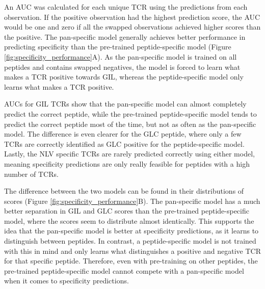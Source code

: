 An AUC was calculated for each unique TCR using the predictions from each observation. If the positive observation had the highest prediction score, the AUC would be one and zero if all the swapped observations achieved higher scores than the positive. The pan-specific model generally achieves better performance in predicting specificity than the pre-trained peptide-specific model (Figure \ref{fig:specificity_performance}A). As the pan-specific model is trained on all peptides and contains swapped negatives, the model is forced to learn what makes a TCR positive towards GIL, whereas the peptide-specific model only learns what makes a TCR positive. 

AUCs for GIL TCRs show that the pan-specific model can almost completely predict the correct peptide, while the pre-trained peptide-specific model tends to predict the correct peptide most of the time, but not as often as the pan-specific model. The difference is even clearer for the GLC peptide, where only a few TCRs are correctly identified as GLC positive for the peptide-specific model. Lastly, the NLV specific TCRs are rarely predicted correctly using either model, meaning specificity predictions are only really feasible for peptides with a high number of TCRs.

The difference between the two models can be found in their distributions of scores (Figure \ref{fig:specificity_performance}B). The pan-specific model has a much better separation in GIL and GLC scores than the pre-trained peptide-specific model, where the scores seem to distribute almost identically. This supports the idea that the pan-specific model is better at specificity predictions, as it learns to distinguish between peptides. In contrast, a peptide-specific model is not trained with this in mind and only learns what distinguishes a positive and negative TCR for that specific peptide. Therefore, even with pre-training on other peptides, the pre-trained peptide-specific model cannot compete with a pan-specific model when it comes to specificity predictions.

